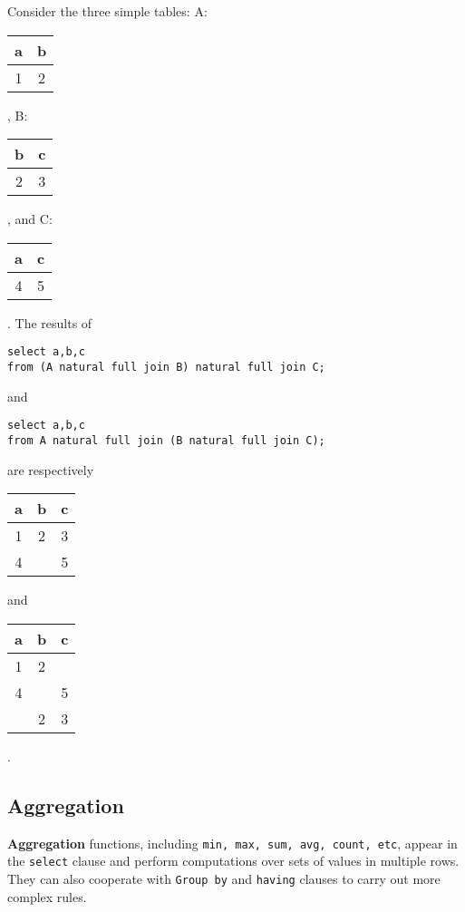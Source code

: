 Consider the three simple tables: A: 
\begin{tabular}{c|c}
\hline
a&b\\\hline
1&2\\\hline
\end{tabular}, B: 
\begin{tabular}{c|c}
\hline
b&c\\\hline
2&3\\\hline
\end{tabular}, and C: 
\begin{tabular}{c|c}
\hline
a&c\\\hline
4&5\\\hline
\end{tabular}. The results of 
\begin{lstlisting}
select a,b,c
from (A natural full join B) natural full join C;
\end{lstlisting}
and 
\begin{lstlisting}
select a,b,c
from A natural full join (B natural full join C);
\end{lstlisting}
are respectively
\begin{tabular}{c|c|c}
\hline
a&b&c\\\hline
1&2&3\\\hline
4&&5\\\hline
\end{tabular}
 and 
\begin{tabular}{c|c|c}
\hline
a&b&c\\\hline
1&2&\\\hline
4&&5\\\hline
&2&3\\\hline
\end{tabular}.
\subsection{Aggregation}
\textbf{Aggregation} functions, including \texttt{min, max, sum, avg, count, etc}, appear in the \texttt{select} clause and perform computations over sets of values in multiple rows. They can also cooperate with \texttt{Group by} and \texttt{having} clauses to carry out more complex rules.

